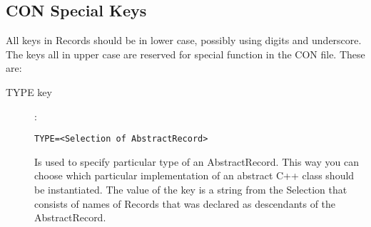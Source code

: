 \subsection{CON Special Keys}
All keys in Records should be in lower case, possibly using digits and underscore. The keys all in upper case are reserved for special function in the 
CON file. These are:
\begin{description}

\item[TYPE key]:
\begin{verbatim}
TYPE=<Selection of AbstractRecord>
\end{verbatim}
Is used to specify particular type of an AbstractRecord. This way you can choose which particular implementation of an abstract C++ class should be instantiated.
The value of the key is a string from the Selection that consists of names of Records that was declared as descendants of the AbstractRecord.


%




\end{description}
